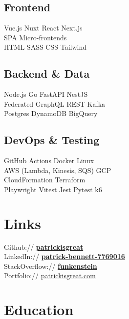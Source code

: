 \documentclass[]{pb-resume-openfonts}
\begin{document}
\begin{minipage}[t]{0.33\textwidth}
\subsection{Frontend}
Vue.js \textbullet{} Nuxt \textbullet{} React \textbullet{} Next.js \\
SPA \textbullet{} Micro-frontends \\
HTML \textbullet{} SASS \textbullet{} CSS \textbullet{} Tailwind
\sectionsep

\subsection{Backend \& Data}
Node.js \textbullet{} Go \textbullet{} FastAPI \textbullet{} NestJS \\
Federated GraphQL \textbullet{} REST \textbullet{} Kafka \\
Postgres \textbullet{} DynamoDB \textbullet{} BigQuery
\sectionsep

\subsection{DevOps \& Testing}
GitHub Actions \textbullet{} Docker \textbullet{} Linux \\
AWS (Lambda, Kinesis, SQS) \textbullet{} GCP \\
CloudFormation \textbullet{} Terraform \\
Playwright \textbullet{} Vitest \textbullet{} Jest \textbullet{} Pytest \textbullet{} k6
\sectionsep


\section{Links}
Github:// \href{https://github.com/patrickisgreat}{\bf patrickisgreat} \\
LinkedIn://  \href{https://www.linkedin.com/in/patrick-bennett-7769016}{\bf patrick-bennett-7769016} \\
StackOverflow:// \href{https://stackoverflow.com/users/864159/funkenstein}{\bf funkenstein} \\
Portfolio:// \href{https://patrickisgreat.com/}{patrickisgreat.com}
\sectionsep


\section{Education}


\end{minipage}
\end{document}
